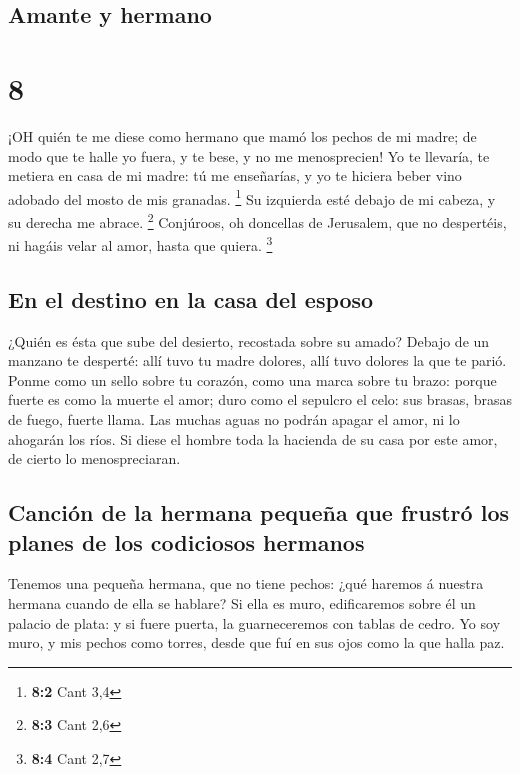 \hypertarget{amante-y-hermano}{%
\subsection{Amante y hermano}\label{amante-y-hermano}}

\hypertarget{section-7}{%
\section{8}\label{section-7}}

 ¡OH quién te me diese como hermano que mamó los pechos de
mi madre; de modo que te halle yo fuera, y te bese, y no me
menosprecien!  Yo te llevaría, te metiera en casa de mi
madre: tú me enseñarías, y yo te hiciera beber vino adobado del mosto de
mis granadas. \footnote{\textbf{8:2} Cant 3,4}  Su izquierda
esté debajo de mi cabeza, y su derecha me abrace. \footnote{\textbf{8:3}
  Cant 2,6}  Conjúroos, oh doncellas de Jerusalem, que no
despertéis, ni hagáis velar al amor, hasta que quiera. \footnote{\textbf{8:4}
  Cant 2,7}

\hypertarget{en-el-destino-en-la-casa-del-esposo}{%
\subsection{En el destino en la casa del
esposo}\label{en-el-destino-en-la-casa-del-esposo}}

 ¿Quién es ésta que sube del desierto, recostada sobre su
amado? Debajo de un manzano te desperté: allí tuvo tu madre dolores,
allí tuvo dolores la que te parió.  Ponme como un sello
sobre tu corazón, como una marca sobre tu brazo: porque fuerte es como
la muerte el amor; duro como el sepulcro el celo: sus brasas, brasas de
fuego, fuerte llama.  Las muchas aguas no podrán apagar el
amor, ni lo ahogarán los ríos. Si diese el hombre toda la hacienda de su
casa por este amor, de cierto lo menospreciaran.

\hypertarget{canciuxf3n-de-la-hermana-pequeuxf1a-que-frustruxf3-los-planes-de-los-codiciosos-hermanos}{%
\subsection{Canción de la hermana pequeña que frustró los planes de los
codiciosos
hermanos}\label{canciuxf3n-de-la-hermana-pequeuxf1a-que-frustruxf3-los-planes-de-los-codiciosos-hermanos}}

 Tenemos una pequeña hermana, que no tiene pechos: ¿qué
haremos á nuestra hermana cuando de ella se hablare?  Si
ella es muro, edificaremos sobre él un palacio de plata: y si fuere
puerta, la guarneceremos con tablas de cedro.  Yo soy muro,
y mis pechos como torres, desde que fuí en sus ojos como la que halla
paz.

